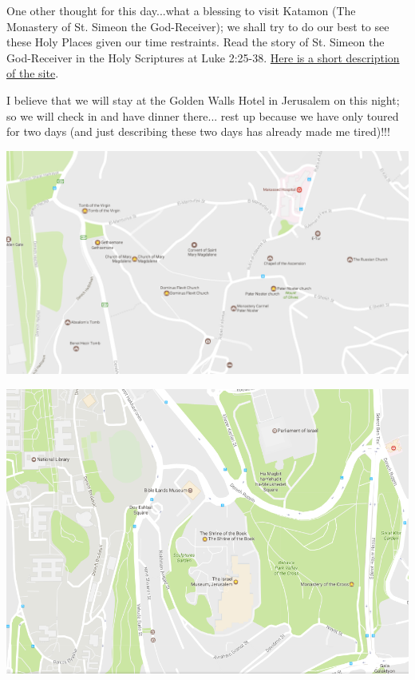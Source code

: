 \documentclass[letterpaper]{report}
\begin{document}
One other thought for this day...what a blessing to visit Katamon
(The Monastery of St. Simeon the God-Receiver);
we shall try to do our best to see these Holy Places given our time
restraints.
Read the story of St. Simeon the God-Receiver in the Holy Scriptures at
Luke 2:25-38.
\href{http://www.goisrael.com/Tourism_Eng/Tourist%20Information/Christian%20Themes/Details/Pages/St.%20Simeon%E2%80%99s%20Monastery%20chr.aspx}
	{Here is a short description of the site}.
	
I believe that we will stay at the Golden Walls Hotel in Jerusalem on this
night; so we will check in and have dinner there...
rest up because we have only toured for two days
(and just describing these two days has already made me tired)!!!

\includegraphics[width=\textwidth]{MountOfOlives}

\includegraphics[width=\textwidth]{IsraelMuseum}

\clearpage
\end{document}
